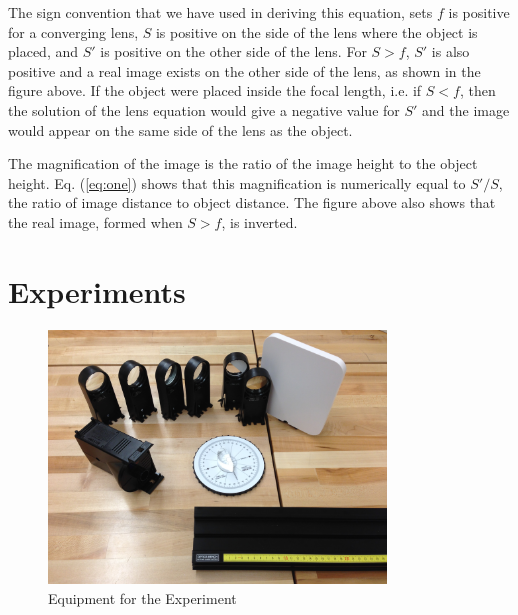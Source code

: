 The sign convention that we have used in deriving this equation, sets $f$ is positive for a converging lens, $S$ is positive on the side of the lens where the object is placed, and $S'$ is positive on the other side of the lens. For $S>f$, $S'$ is also positive and a real image exists on the other side of the lens, as shown in the figure above. If the object were placed inside the focal length, i.e. if $S<f$, then the solution of the lens equation would give a negative value for $S'$ and the image would appear on the same side of the lens as the object.\myskip

The magnification of the image is the ratio of the image height to the object height. Eq. ({\ref{eq:one}}) shows that this magnification is numerically equal to $S'/S$, the ratio of image distance to object distance. The figure above also shows that the real image, formed when $S>f$, is inverted.

\section{Experiments}

\begin{figure}[h]
    \begin{center}
        \includegraphics[width=0.8\textwidth]{./Exp6/pic/equipment.jpg}
    \end{center}
    \caption{Equipment for the Experiment}
    \label{fig:equip4}
\end{figure}

